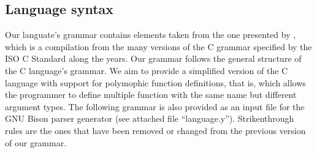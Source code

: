 \subsection{Language syntax}

Our languate's grammar contains elements taken from the one presented by \textcite{Harbison2002},
which is a compilation from the many versions of the C grammar specified by the ISO C Standard
along the years. Our grammar follows the general structure of the C language's grammar.
We aim to provide a simplified version of the C language with support for polymophic function
definitions, that is, which allows the programmer to define multiple function with the same name
but different argument types. The following grammar is also provided as an input file for the
GNU Bison \cite{BISON} parser generator (see attached file ``language.y''). Strikenthrough
rules are the ones that have been removed or changed from the previous version of our grammar.

